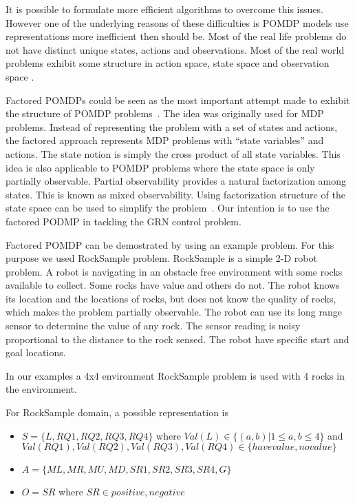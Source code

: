It is possible to formulate more efficient algorithms to overcome this issues. However one of the underlying reasons of these difficulties is POMDP models use representations more inefficient then should be. Most of the real life problems do not have distinct unique states, actions and observations. Most of the real world problems exhibit some structure in action space, state space and observation space \cite{schut02}.

Factored POMDPs could be seen as the most important attempt made to exhibit the structure of POMDP
problems~\cite{Boutilier95}. The idea was originally used for MDP problems. Instead of representing the
problem with a set of states and actions, the factored approach represents MDP problems with ``state
variables'' and actions. The state notion is simply the cross product of all state variables. This idea is
also applicable to POMDP problems where the state space is only partially observable. Partial observability
provides a natural factorization among states. This is known as mixed observability. Using factorization
structure of the state space can be used to simplify the problem~\cite{Smith07, Kveton06}. Our intention is
to use the factored PODMP in tackling the GRN control problem. 

Factored POMDP can be demostrated by using an example problem. For this purpose we used RockSample problem. RockSample is a simple 2-D robot problem. A robot is navigating in an obstacle free environment with some rocks available to collect. Some rocks have value and others do not. The robot knows its location and the locations of rocks, but does not know the quality of rocks, which makes the problem partially observable. The robot can use its long range sensor to determine the value of any rock. The sensor reading is noisy proportional to the distance to the rock sensed. The robot have specific start and goal locations.

In our examples a 4x4 environment RockSample problem is used with 4 rocks in the environment.

For RockSample domain, a possible representation is

\begin{itemize}
\item $S = \{ L , RQ1, RQ2, RQ3, RQ4\}$ where $Val(L) \in \{(a,b) | 1 \le a,b \le 4\}$ and $Val(RQ1),Val(RQ2),Val(RQ3),Val(RQ4) \in \{havevalue, novalue\}$
\item $A = \{ ML, MR, MU, MD, SR1, SR2, SR3, SR4, G\}$
\item $O = {SR}$ where $SR \in {positive, negative}$
\end{itemize}

